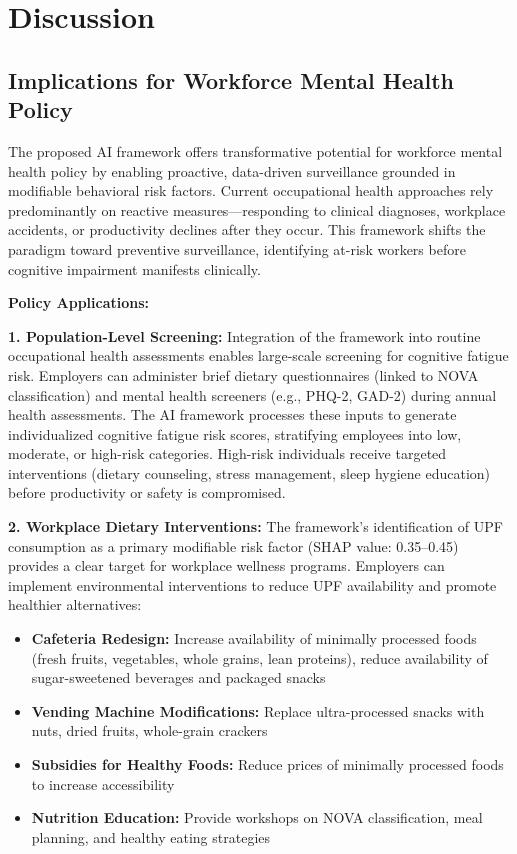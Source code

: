 \documentclass[journal,twoside,10pt]{IEEEtran}
\begin{document}
\section{Discussion}

\subsection{Implications for Workforce Mental Health Policy}

The proposed AI framework offers transformative potential for workforce mental health policy by enabling proactive, data-driven surveillance grounded in modifiable behavioral risk factors. Current occupational health approaches rely predominantly on reactive measures---responding to clinical diagnoses, workplace accidents, or productivity declines after they occur. This framework shifts the paradigm toward preventive surveillance, identifying at-risk workers before cognitive impairment manifests clinically.

\textbf{Policy Applications:}

\textbf{1. Population-Level Screening:}
Integration of the framework into routine occupational health assessments enables large-scale screening for cognitive fatigue risk. Employers can administer brief dietary questionnaires (linked to NOVA classification) and mental health screeners (e.g., PHQ-2, GAD-2) during annual health assessments. The AI framework processes these inputs to generate individualized cognitive fatigue risk scores, stratifying employees into low, moderate, or high-risk categories. High-risk individuals receive targeted interventions (dietary counseling, stress management, sleep hygiene education) before productivity or safety is compromised.

\textbf{2. Workplace Dietary Interventions:}
The framework's identification of UPF consumption as a primary modifiable risk factor (SHAP value: 0.35--0.45) provides a clear target for workplace wellness programs. Employers can implement environmental interventions to reduce UPF availability and promote healthier alternatives:
\begin{itemize}
\item \textbf{Cafeteria Redesign:} Increase availability of minimally processed foods (fresh fruits, vegetables, whole grains, lean proteins), reduce availability of sugar-sweetened beverages and packaged snacks
\item \textbf{Vending Machine Modifications:} Replace ultra-processed snacks with nuts, dried fruits, whole-grain crackers
\item \textbf{Subsidies for Healthy Foods:} Reduce prices of minimally processed foods to increase accessibility
\item \textbf{Nutrition Education:} Provide workshops on NOVA classification, meal planning, and healthy eating strategies
\end{itemize}
\end{document}
